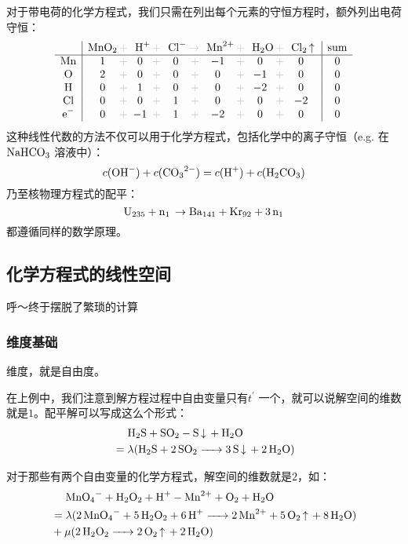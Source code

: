\documentclass{ctexart}
\newcommand{\grayplus}{\,\color{lightgray}+\,}
\newcommand{\grayto}{\,\color{lightgray}\to\,}
\begin{document}
对于带电荷的化学方程式，我们只需在列出每个元素的守恒方程时，额外列出电荷守恒：
\[
    \begin{array}{c|*{5}{c@{\grayplus}}c|c}
        & \multicolumn{1}{c@{\grayplus}}{\ce{MnO2}} &
        \multicolumn{1}{c@{\grayplus}}{\ce{H+}} &
        \multicolumn{1}{c@{\grayto}}{\ce{Cl-}} &
        \multicolumn{1}{c@{\grayplus}}{\ce{Mn^2+}} &
        \multicolumn{1}{c@{\grayplus}}{\ce{H2O}} &
        \multicolumn{1}{c|}{\ce{Cl2 ^}} & \text{sum} \\
        \hline
        \ce{Mn} & 1 & 0 & 0 & -1 & 0 & 0 & 0\\
        \ce{O} & 2 & 0 & 0 & 0 & -1 & 0 & 0\\
        \ce{H} & 0 & 1 & 0 & 0 & -2 & 0 & 0\\
        \ce{Cl} & 0 & 0 & 1 & 0 & 0 & -2 & 0\\
        \ce{e^-} & 0 & -1 & 1 & -2 & 0 & 0 & 0\\
    \end{array}
\]
这种线性代数的方法不仅可以用于化学方程式，包括化学中的离子守恒（e.g. 在\(\ce{NaHCO3}\) 溶液中）：
\[
    c(\ce{OH^-}) + c(\ce{CO3^{2-}}) = c(\ce{H^+}) + c(\ce{H2CO3})
\]
乃至核物理方程式的配平：\[
    \ce{U235 + n1 \to Ba141 + Kr92 + 3n1}
\]
都遵循同样的数学原理。

\subsection{化学方程式的线性空间}

呼～终于摆脱了繁琐的计算

\subsubsection{维度基础}

维度，就是自由度。

在上例中，我们注意到解方程过程中自由变量只有\(t^{\prime}\) 一个，就可以说解空间的维数就是\(1\)。配平解可以写成这么个形式：
\begin{align*}
    &\placeholder{=}\ce{H2S +  SO2 -  S v + H2O}\\
    &= \lambda (\ce{H2S + 2 SO2 -> 3 S v + 2 H2O})
\end{align*}

对于那些有两个自由变量的化学方程式，解空间的维数就是\(2\)，如：
\begin{align*}
    &\placeholder{=}\ce{MnO4^- + H2O2 + H^+ - Mn^2+ + O2 + H2O} \\
    &=\lambda(\ce{2 MnO4^- + 5 H2O2 + 6 H^+ -> 2 Mn^2+ + 5 O2 ^ + 8 H2O}) \\
    &+\mu(\ce{2 H2O2 -> 2 O2 ^ + 2 H2O})
\end{align*}
\end{document}
